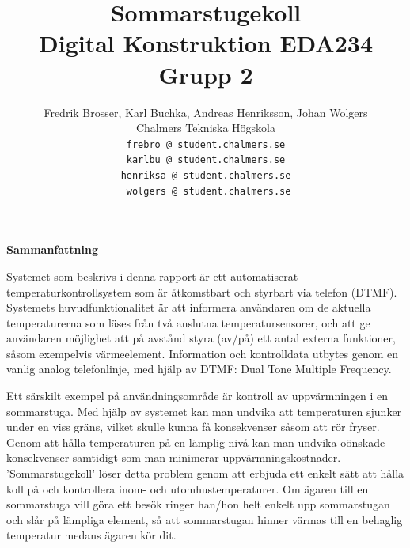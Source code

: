 \documentclass[a4paper,11pt]{article}
\begin{document}
\title{Sommarstugekoll \\
	Digital Konstruktion EDA234 \\ Grupp 2}
\author{Fredrik Brosser, Karl Buchka, Andreas Henriksson, Johan Wolgers \\
   	Chalmers Tekniska Högskola \\
  	\texttt{	frebro @ student.chalmers.se }\\
	\texttt{	karlbu @ student.chalmers.se }\\
	\texttt{	henriksa @ student.chalmers.se }\\
	\texttt{	wolgers @ student.chalmers.se \\ }}

\maketitle

\pagebreak

\tableofcontents

\pagebreak

\begin{center}
{\noindent \bf Sammanfattning}
\end{center}


	Systemet som beskrivs i denna rapport är ett automatiserat temperaturkontrollsystem som är åtkomstbart och styrbart via
	telefon (DTMF). Systemets huvudfunktionalitet är att informera användaren om de aktuella temperaturerna som läses från
	två anslutna temperatursensorer, och att ge användaren möjlighet att på avstånd styra (av/på) ett antal externa funktioner,
	såsom exempelvis värmeelement. Information och kontrolldata utbytes genom en vanlig analog telefonlinje, med hjälp av DTMF:
	Dual Tone Multiple Frequency. 

	Ett särskilt exempel på användningsområde är kontroll av uppvärmningen i en sommarstuga. Med hjälp av systemet kan man
	undvika att temperaturen sjunker under en viss gräns, vilket skulle kunna få konsekvenser såsom att rör fryser. Genom att
	hålla temperaturen på en lämplig nivå kan man undvika oönskade konsekvenser samtidigt som man minimerar uppvärmningskostnader.
	'Sommarstugekoll' löser detta problem genom att erbjuda ett enkelt sätt att hålla koll på och kontrollera inom- och utomhustemperaturer.
	Om ägaren till en sommarstuga vill göra ett besök ringer han/hon helt enkelt upp sommarstugan och slår på lämpliga element, så att
	sommarstugan hinner värmas till en behaglig temperatur medans ägaren kör dit.
\end{document}

